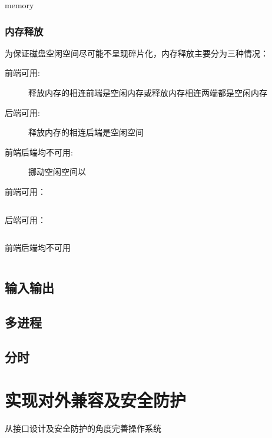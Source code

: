 \documentclass{swfcthesis}
\begin{document}
		\begin{listing}[H]
		\inputminted[tabsize=2, firstline=68, lastline=80,
		linenos=true]{c}{../ZOS/src/kernel/memory.c}
		\end{listing}

		memory
		\subsection{内存释放}
		为保证磁盘空闲空间尽可能不呈现碎片化，内存释放主要分为三种情况：
		\begin{description}
			\item[前端可用:]释放内存的相连前端是空闲内存或释放内存相连两端都是空闲内存
			\item[后端可用:]释放内存的相连后端是空闲空间
			\item[前端后端均不可用:]挪动空闲空间以
		\end{description}

		前端可用：
		\begin{listing}[H]
		\inputminted[tabsize=2, firstline=97, lastline=117,
		linenos=true]{c}{../ZOS/src/kernel/memory.c}
		\end{listing}

		后端可用：
		\begin{listing}[H]
		\inputminted[tabsize=2, firstline=118, lastline=127,
		linenos=true]{c}{../ZOS/src/kernel/memory.c}
		\end{listing}

		前端后端均不可用
		\begin{listing}[H]
		\inputminted[tabsize=2, firstline=128, lastline=141,
		linenos=true]{c}{../ZOS/src/kernel/memory.c}
		\end{listing}

	\section{输入输出}
	\section{多进程}
	\section{分时}
	
\chapter{实现对外兼容及安全防护}
从接口设计及安全防护的角度完善操作系统
\end{document}
